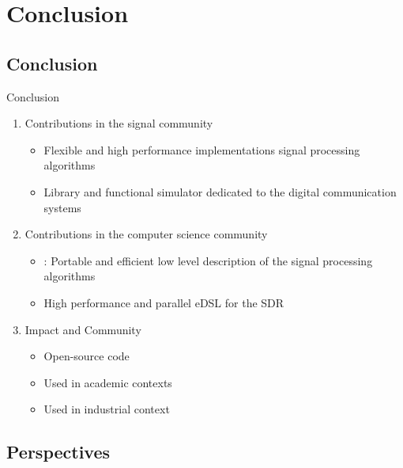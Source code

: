 
\section[Conclusion]{Conclusion}

\subsection[Conclusion]{Conclusion}

\begin{frame}{Conclusion}
  \vfill
  \begin{enumerate}
    \item Contributions in the signal community
    \begin{itemize}
      \item Flexible and high performance implementations signal processing algorithms~\cite{Cassagne2015c,Cassagne2016a,Cassagne2016b,Leonardon2019,Ghaffari2019}
      \item Library and functional simulator dedicated to the digital communication systems~\cite{Cassagne2017,Cassagne2017a,Cassagne2019a}
    \end{itemize}
    \vspace{0.3cm}
    \pause
    \item Contributions in the computer science community
    \begin{itemize}
      \item \MIPP: Portable and efficient low level description of the signal processing algorithms~\cite{Cassagne2018}
      \item High performance and parallel eDSL for the SDR
    \end{itemize}
    \vspace{0.3cm}
    \pause
    \item Impact and Community
    \begin{itemize}
      \item Open-source code
      \item Used in academic contexts
      \item Used in industrial context
    \end{itemize}
  \end{enumerate}
  \vfill
\end{frame}

\subsection[Perspectives]{Perspectives}


